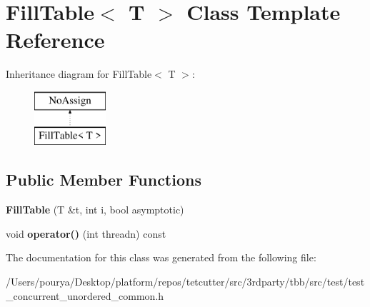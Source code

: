 \hypertarget{classFillTable}{}\section{Fill\+Table$<$ T $>$ Class Template Reference}
\label{classFillTable}
Inheritance diagram for Fill\+Table$<$ T $>$\+:\begin{figure}[H]
\begin{center}
\leavevmode
\includegraphics[height=2.000000cm]{classFillTable}
\end{center}
\end{figure}
\subsection*{Public Member Functions}
\begin{DoxyCompactItemize}
\item 
\hypertarget{classFillTable_a3849aad6cf992f0b904f03a96cd07dbc}{}{\bfseries Fill\+Table} (T \&t, int i, bool asymptotic)\label{classFillTable_a3849aad6cf992f0b904f03a96cd07dbc}

\item 
\hypertarget{classFillTable_a0576a8d98a178edbd1ca885614ea062f}{}void {\bfseries operator()} (int threadn) const \label{classFillTable_a0576a8d98a178edbd1ca885614ea062f}

\end{DoxyCompactItemize}


The documentation for this class was generated from the following file\+:\begin{DoxyCompactItemize}
\item 
/\+Users/pourya/\+Desktop/platform/repos/tetcutter/src/3rdparty/tbb/src/test/test\+\_\+concurrent\+\_\+unordered\+\_\+common.\+h\end{DoxyCompactItemize}
